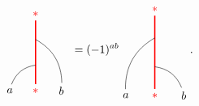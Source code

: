 \begin{enumerate}
			\begin{equation}
				\begin{tikzpicture}[scale=0.8,baseline=(current bounding box.center)]
				\node[red](m) at (0,0) {$*$};
				\node(a) at (-1,0) {$a$};
				\node(b) at (1,0) {$b$};
				\node[red](abm) at (0,3) {$*$};
				\draw[red,line width=0.4mm] (m) -- (abm);
				\draw (a) to [bend left] (0,1);
				\draw (b) to [bend right] (0,2);
				\end{tikzpicture}\ =(-1)^{ab}
				\begin{tikzpicture}[scale=0.9,baseline=(current bounding box.center)]
				\node[red](m) at (0,0) {$*$};
				\node(a) at (-1,0) {$a$};
				\node(b) at (1,0) {$b$};
				\node[red](abm) at (0,3) {$*$};
				\draw[red,line width=0.4mm] (m) -- (abm);
				\draw (b) to [bend right] (0,1);
				\draw (a) to [bend left] (0,2);
				\end{tikzpicture}.\label{eqn:F1}
			\end{equation}
	\end{enumerate}

